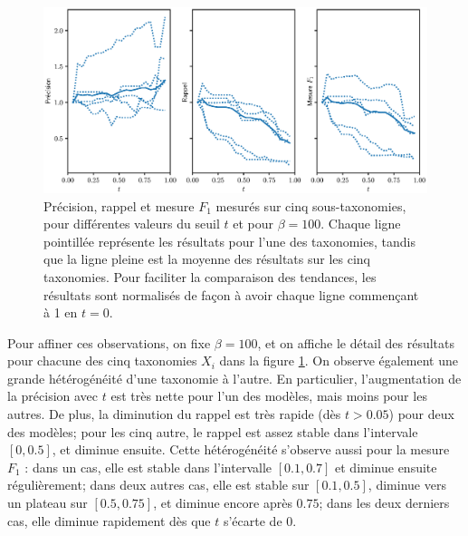 \begin{figure}[h]
    \centering
    \includegraphics[width=\textwidth]{fig/plot/threshold_breakdown_avg_no_event.eps}
    \caption[Influence du seuil de probabilité sur l'extraction de taxonomie pour $\beta=100$]{Précision, rappel et mesure $F_1$ mesurés sur cinq sous-taxonomies, pour différentes valeurs du seuil $t$ et pour $\beta=100$. Chaque ligne pointillée représente les résultats pour l'une des taxonomies, tandis que la ligne pleine est la moyenne des résultats sur les cinq taxonomies. Pour faciliter la comparaison des tendances, les résultats sont normalisés de façon à avoir chaque ligne commençant à 1 en $t = 0$.}
    \label{fig:threshold-search-1}
\end{figure}

Pour affiner ces observations, on fixe $\beta = 100$, et on affiche le détail des résultats pour chacune des cinq taxonomies $X_i$ dans la figure \ref{fig:threshold-search-1}. On observe également une grande hétérogénéité d'une taxonomie à l'autre. En particulier, l'augmentation de la précision avec $t$ est très nette pour l'un des modèles, mais moins pour les autres. De plus, la diminution du rappel est très rapide (dès $t > 0.05$) pour deux des modèles; pour les cinq autre, le rappel est assez stable dans l'intervale $[0, 0.5]$, et diminue ensuite. Cette hétérogénéité s'observe aussi pour la mesure $F_1$ : dans un cas, elle est stable dans l'intervalle $[0.1, 0.7]$ et diminue ensuite régulièrement; dans deux autres cas, elle est stable sur $[0.1, 0.5]$, diminue vers un plateau sur $[0.5, 0.75]$, et diminue encore après $0.75$; dans les deux derniers cas, elle diminue rapidement dès que $t$ s'écarte de $0$.


